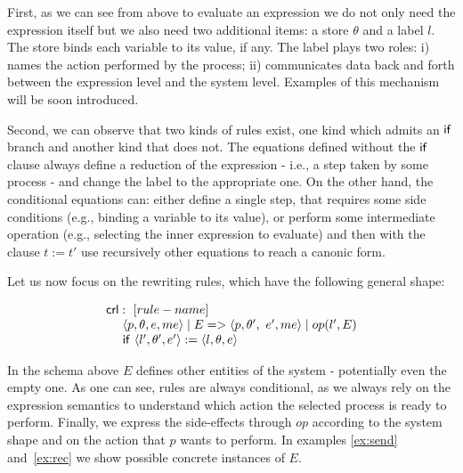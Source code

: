 \documentclass{article}[12pt,a4paper]
\theoremstyle{definition}
\newcommand{\paral}{\;|\;}
\begin{document}
First, as we can see from above to evaluate an expression we do not only need
the expression itself but we also need two additional items:
a store $\theta$ and a label $l$. The store binds each variable to its
value, if any. The label plays two roles:
i) names the action performed by the process; ii) communicates data back and
forth between the expression level and the system level. Examples of this mechanism will be soon introduced.

Second, we can observe that two kinds of rules exist, one kind which admits an $\mathsf{if}$
branch and another kind that does not. The equations defined without the
$\mathsf{if}$ clause always define a reduction of the expression - i.e., a step
taken by some process - and change the label to
the appropriate one. On the other hand, the conditional equations can: either define a single
step, that requires some side conditions (e.g., binding a
variable to its value), or perform some
intermediate operation (e.g., selecting the inner expression to evaluate) and
then with the clause $t:=t'$ use recursively other equations to reach a canonic form.

Let us now focus on the rewriting rules, which have the following general shape:

\[
  \begin{array}{l}

    \ms{crl}:~[rule-name]\\
    ~~~~\langle p, \theta, e, me \rangle \paral E => \langle p,\theta',~e', me \rangle \paral op(l', E)\\
    ~~~~\ms{if}~\langle l', \theta', e'\rangle := \langle l,\theta,e\rangle


  \end{array}
\]

In the schema above $E$ defines other entities of the system -
potentially even the empty one. As one can see, rules are always
conditional, as we always rely on the expression semantics to understand which
action the selected process is ready to perform. Finally, we express the side-effects through $op$ according to the
system shape and on the action that $p$ wants to perform. In examples
\ref{ex:send} and~\ref{ex:rec} we show possible concrete instances of $E$.  
\end{document}
